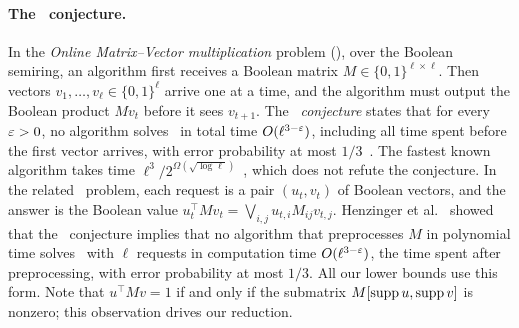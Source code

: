 \paragraph{The \OMv\ conjecture.}
In the \emph{Online Matrix--Vector multiplication} problem (\OMv), over the Boolean semiring, an algorithm first receives a Boolean matrix $M\in\{0,1\}^{\ell\times\ell}$.
Then vectors $v_1,\dots,v_\ell\in\{0,1\}^{\ell}$ arrive one at a time, and the algorithm must output the Boolean product $Mv_t$ before it sees $v_{t+1}$.
The \OMv\ \emph{conjecture} states that for every $\varepsilon>0$, no algorithm solves \OMv\ in total time $O(\ell^{3-\varepsilon})$, including all time spent before the first vector arrives, with error probability at most $1/3$~\cite[Conjecture~1.1]{HKNS15full}.
The fastest known algorithm takes time $\ell^3/2^{\Omega(\sqrt{\log\ell})}$~\cite{LW17}, which does not refute the conjecture.
In the related \OuMv\ problem, each request is a pair $(u_t,v_t)$ of Boolean vectors, and the answer is the Boolean value $u_t^{\top}Mv_t=\bigvee_{i,j}u_{t,i}M_{ij}v_{t,j}$.
Henzinger et al.~\cite[Theorem~2.7]{HKNS15full} showed that the \OMv\ conjecture implies that no algorithm that preprocesses $M$ in polynomial time solves \OuMv\ with $\ell$ requests in computation time $O(\ell^{3-\varepsilon})$, the time spent after preprocessing, with error probability at most $1/3$.
All our lower bounds use this form.
Note that $u^{\top}Mv=1$ if and only if the submatrix $M[\operatorname{supp} u,\operatorname{supp} v]$ is nonzero; this observation drives our reduction.
